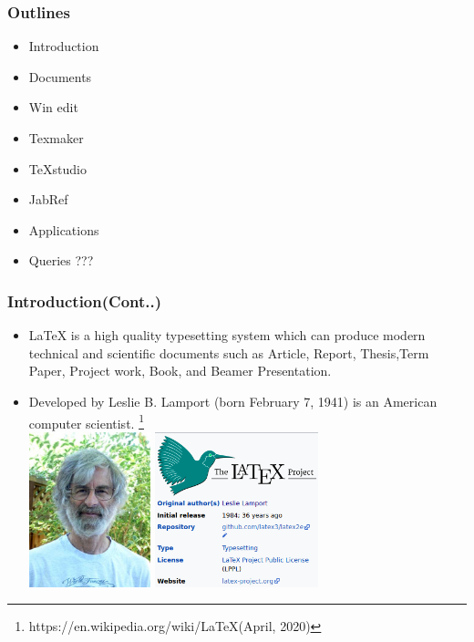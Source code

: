 \documentclass{beamer}
\begin{document}
			\begin{frame}		
				\frametitle{\bf Outlines}
				\begin{itemize}
					\bfseries
			\item \color{red}Introduction
			\item \color{blue}Documents
			\item \color{red}Win edit
			\item \color{blue}Texmaker
			\item \color{red}TeXstudio
			\item \color{blue}JabRef
			\item \color{red}Applications
			\item \color{blue}Queries ???
						
				\end{itemize}	
			\end{frame}
			\begin{frame}		
		\frametitle{\bf Introduction(Cont..)}
		\begin{itemize}
			\bfseries
			\item \color{red}LaTeX is a high quality typesetting system which can produce
			modern technical and scientific documents such as Article, Report, Thesis,Term Paper, Project work, Book, and \color{violet}Beamer Presentation.\\
			\item \color{blue} Developed by Leslie B. Lamport (born February 7, 1941) is an American computer scientist.	\footnote{https://en.wikipedia.org/wiki/LaTeX(April, 2020)}\\
			\centering
	\includegraphics[height=4.5cm]{LM}\hspace{1cm}
	\includegraphics[height=4.5cm]{LA}
		
		\end{itemize}	
	\end{frame}
\end{document}
